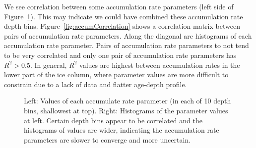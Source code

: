 We see correlation between some accumulation rate parameters (left side of Figure~\ref{fig:accumconvergence}). This may indicate we could have combined these accumulation rate depth bins. Figure~\ref{fig:accumCorrelation} shows a correlation matrix between pairs of accumulation rate parameters. Along the diagonal are histograms of each accumulation rate parameter. Pairs of accumulation rate parameters to not tend to be very correlated and only one pair of accumulation rate parameters has $R^2 > 0.5$. In general, $R^2$ values are highest between accumulation rates in the lower part of the ice column, where parameter values are more difficult to constrain due to a lack of data and flatter age-depth profile.


\begin{figure}[ht]
\centering
{}
\caption[]{Left: Values of each accumulate rate parameter (in each of 10 depth bins, shallowest at top). Right: Histograms of the parameter values at left. Certain depth bins appear to be correlated and the histograms of values are wider, indicating the accumulation rate parameters are slower to converge and more uncertain.}
\label{fig:accumconvergence}
\end{figure}

